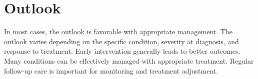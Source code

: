 \section{Outlook}
In most cases, the outlook is favorable with appropriate management. The outlook varies depending on the specific condition, severity at diagnosis, and response to treatment. Early intervention generally leads to better outcomes. Many conditions can be effectively managed with appropriate treatment. Regular follow-up care is important for monitoring and treatment adjustment.
